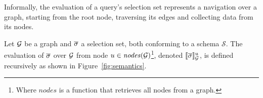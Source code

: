 







Informally, the evaluation of a query's selection set represents a navigation over a graph, starting from the root node, traversing its edges and collecting data from its nodes. %

\begin{definition}
Let $\mathcal{G}$ be a graph and $\overline{\sigma}$ a selection set, both conforming to a schema $\mathcal{S}$. The evaluation of $\overline{\sigma}$ over $\mathcal{G}$ from node $u \in \mathit{nodes}(\mathcal{G})$\footnote{Where $\mathit{nodes}$ is a function that retrieves all nodes from a graph.}, denoted $\llbracket \overline{\sigma} \rrbracket^{u}_{\mathcal{G}}$, is defined recursively as shown in Figure~\ref{fig:semantics}. 
\end{definition}

